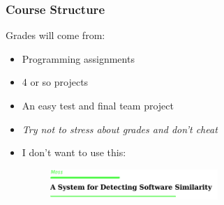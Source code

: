 \documentclass{beamer}
\begin{document}
\begin{frame}
  \frametitle{Course Structure}
  Grades will come from:
  \begin{itemize}
  \item<1-> Programming assignments 
  \item<2-> 4 or so projects 
  \item<3-> An easy test and final team  project
  \item<4-> \emph{Try not to stress about grades and \emph{don't cheat}}
  \item<5-> I don't want to use this:
    \begin{figure}[t]
      \includegraphics[width=0.6\textwidth]{images/moss.png}
    \end{figure}
  \end{itemize}
\end{frame}
\end{document}
